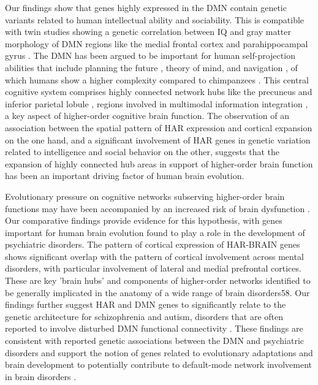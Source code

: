 \begin{refsection}
Our findings show that genes highly expressed in the DMN contain genetic variants related to human intellectual ability and sociability. This is compatible with twin studies showing a genetic correlation between IQ and gray matter morphology of DMN regions like the medial frontal cortex and parahippocampal gyrus \citep{hulshoff2006van}. The DMN has been argued to be important for human self-projection abilities that include planning the future \citep{suddendorf2009mental}, theory of mind, and navigation \citep{buckner2007self}, of which humans show a higher complexity compared to chimpanzees \citep{corballis2013mental}. This central cognitive system comprises highly connected network hubs like the precuneus and inferior parietal lobule \citep{van_den_heuvel_network_2013}, regions involved in multimodal information integration \citep{barbey2018network}, a key aspect of higher-order cognitive brain function. The observation of an association between the spatial pattern of HAR expression and cortical expansion on the one hand, and a significant involvement of HAR genes in genetic variation related to intelligence and social behavior on the other, suggests that the expansion of highly connected hub areas in support of higher-order brain function has been an important driving factor of human brain evolution.

Evolutionary pressure on cognitive networks subserving higher-order brain functions may have been accompanied by an increased risk of brain dysfunction \citep{crow1997schizophrenia,Heuvel2019EvolutionaryMI}. Our comparative findings provide evidence for this hypothesis, with genes important for human brain evolution found to play a role in the development of psychiatric disorders. The pattern of cortical expression of HAR-BRAIN genes shows significant overlap with the pattern of cortical involvement across mental disorders, with particular involvement of lateral and medial prefrontal cortices. These are key 'brain hubs' and components of higher-order networks identified to be generally implicated in the anatomy of a wide range of brain disorders58. Our findings further suggest HAR and DMN genes to significantly relate to the genetic architecture for schizophrenia and autism, disorders that are often reported to involve disturbed DMN functional connectivity \citep{padmanabhan2017default,Lange2019SharedVF}. These findings are consistent with reported genetic associations between the DMN and psychiatric disorders \citep{meda2014multivariate} and support the notion of genes related to evolutionary adaptations and brain development to potentially contribute to default-mode network involvement in brain disorders \citep{meda2014multivariate}.


\end{refsection}
